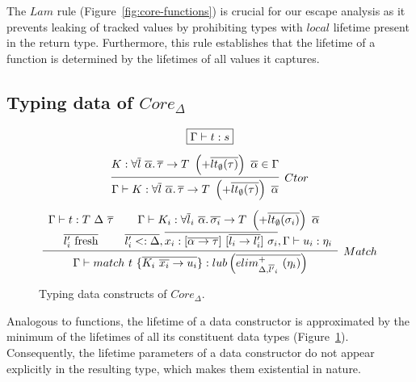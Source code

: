 \documentclass[11pt]{article}
\newcommand{\mathframebox}[1]{\framebox{$\displaystyle #1$}}
\newcommand{\ap}{~}
\begin{document}
    The $Lam$ rule (Figure\ \ref{fig:core-functions}) is crucial for our escape analysis as it prevents leaking of tracked values by prohibiting types with $local$ lifetime present in the return type.
    Furthermore, this rule establishes that the lifetime of a function is determined by the lifetimes of all values it captures.

    \subsection{Typing data of $Core_\Delta$} \label{subsec:typing-data}

    \begin{figure}
        \begin{gather*}
            \mathframebox{\Gamma\vdash t : s} \\[0.5em]
            \infer[Ctor]{\Gamma\vdash K : \forall\overline{l}\ \overline{\alpha}\ldotp \overline{\tau}\to T \ap\left(+\overline{lt_\emptyset(\tau)}\right)\ap \overline{\alpha}}{K : \forall\overline{l}\ \overline{\alpha}\ldotp \overline{\tau}\to T \ap\left(+\overline{lt_\emptyset(\tau)}\right)\ap \overline{\alpha} \in \Gamma} \\[0.5em]
            \infer[Match]{
                \Gamma\vdash match ~ t ~\{ \overline{K_i\ap \overline{x_{i}} \to u_i }\}  : lub\left(\overline{elim^+_{\Delta, \overline{l'}_i}\ap(\eta_i)}\right)
            }{
                \begin{array}{cc}
                    \Gamma\vdash t : T\ap\Delta \ap\overline{\tau}
                    &
                    \Gamma\vdash K_i : \forall \overline{l}_i~\overline{\alpha}\ldotp \overline{\sigma_{i}} \to T\ap\left(+\overline{lt_\emptyset(\sigma_i)}\right)\ap\overline{\alpha}
                    \\[0.4em]
                    \overline{l_i' \text{ fresh}}
                    &
                    \overline{l_i' <: \Delta}, \overline{x_i : [\overline{\alpha\to\tau}]\ap[\overline{l_i\to l_i'}]\ap\sigma_i}, \Gamma \vdash u_i : \eta_i
                \end{array}
            }
        \end{gather*}
        \caption{Typing data constructs of $Core_{\Delta}$.}
        \label{fig:core-data-typing}
    \end{figure}

    Analogous to functions, the lifetime of a data constructor is approximated by the minimum of the lifetimes of all its constituent data types (Figure\ \ref{fig:core-data-typing}).
    Consequently, the lifetime parameters of a data constructor do not appear explicitly in the resulting type, which makes them existential in nature.
\end{document}
